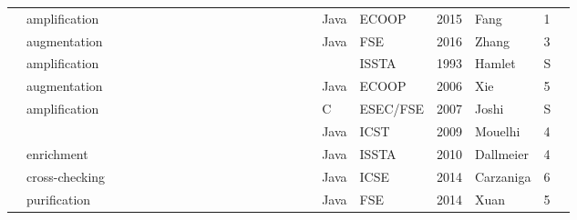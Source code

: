 \begin{table*}
\begin{adjustbox}{max width=\textwidth,center=\textwidth}
\begin{tabular}{llllllllllllllllllllllll}
            \cite{fang2015perfblower}                       & amplification                     &    &    & \X &    &    &    & \X &    &    &    &    & \X &    &    &    &    & Java        & ECOOP                                                    & 2015 & Fang           & 1 \\
            \cite{Zhang2016Isomorphic}                      & augmentation                      &    &    & \X &    & \X &    & \X &    &    & \X &    & \X &    &    & \X &    & Java        & FSE                                                      & 2016 & Zhang          & 3 \\
            \cite{HamletV93}                                & amplification                     &    &    &    & \X &    &    &    &    &    & \X &    &    &    &    &    &    &             & ISSTA                                                    & 1993 & Hamlet         & S \\
            \cite{Xie2006}                                  & augmentation                      &    &    &    & \X &    &    &    &    &    &    & \X &    & \X &    &    &    & Java        & ECOOP                                                    & 2006 & Xie            & 5 \\
            \cite{Joshi07}                                  & amplification                     &    &    &    & \X &    &    &    &    &    & \X &    &    &    & \X &    &    & C           & ESEC/FSE                                                 & 2007 & Joshi          & S \\
            \cite{Mouelhi:2009}                             &                                   &    &    &    & \X &    &    &    &    &    & \X & \X &    &    &    &    &    & Java        & ICST                                                     & 2009 & Mouelhi        & 4 \\
            \cite{Dallmeier2010}                            & enrichment                        &    &    &    & \X &    &    &    &    &    & \X & \X &    &    &    &    &    & Java        & ISSTA                                                    & 2010 & Dallmeier      & 4 \\
            \cite{Carzaniga:2014:COI:2568225.2568287}       & cross-checking                    &    &    &    & \X &    &    &    &    &    & \X &    &    & \X &    &    &    & Java        & ICSE                                                     & 2014 & Carzaniga      & 6 \\
            \cite{xuan2014test}                             & purification                      &    &    &    & \X &    &    &    & \X &    &    & \X &    &    &    &    &    & Java        & FSE                                                      & 2014 & Xuan           & 5 \\

\end{tabular}
\end{adjustbox}
\end{table*}
